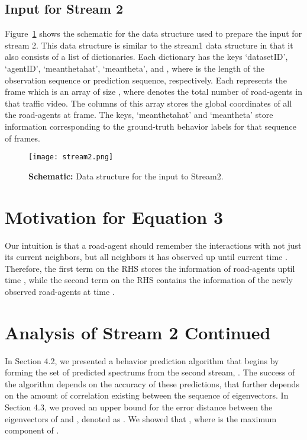\documentclass[10pt,twocolumn,letterpaper]{article}
\theoremstyle{plain}
\begin{document}
\subsection{Input for Stream 2}
Figure~\ref{fig:stream2} shows the schematic for the data structure used to prepare the input for stream 2. This data structure is similar to the stream1 data structure in that it also consists of  a list of dictionaries. Each dictionary has the keys `datasetID', `agentID', `meanthetahat', `meantheta', and , where  is the length of the observation sequence or prediction sequence, respectively. Each  represents the  frame which is an array of size , where  denotes the total number of road-agents in that traffic video. The columns of this array stores the global  coordinates of all the road-agents at  frame. The keys, `meanthetahat' and `meantheta' store information corresponding to the ground-truth behavior labels for that sequence of frames.

\begin{figure}[h]
\texttt{[image: stream2.png]}
    \caption{\textbf{Schematic:} Data structure for the input to Stream2.}
\label{fig:stream2}
\end{figure}



 \section{Motivation for Equation 3}

Our intuition is that a road-agent should remember the interactions with not just its current neighbors, but all neighbors it has observed up until current time . Therefore, the first term on the RHS stores the information of road-agents uptil time , while the second term on the RHS contains the information of the newly observed road-agents at time .






\section{Analysis of Stream 2 Continued}

In Section 4.2, we presented a behavior prediction algorithm that begins by forming the set of predicted spectrums from the second stream, . The success of the algorithm depends on the accuracy of these predictions, that further depends on the amount of correlation existing between the sequence of eigenvectors. In Section 4.3, we proved an upper bound for the error distance between the  eigenvectors of  and , denoted as . We showed that , where  is the maximum component of .
\end{document}
